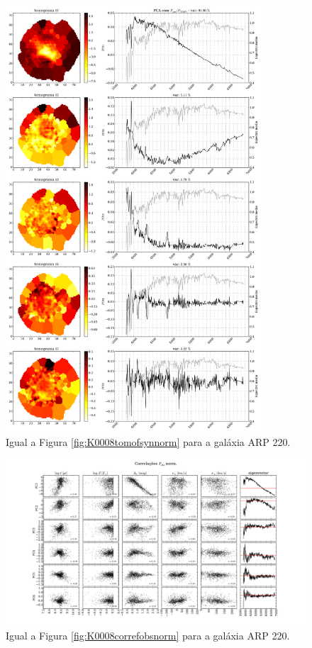 \begin{figure}
    \includegraphics[width=0.85\textwidth]{figuras/K0802-tomo-syn-norm.pdf}
    \caption[Tomogramas de 1 a 5 para o cubo $F_{obs}$ norm. - ARP 220.]
    {Igual a Figura \ref{fig:K0008tomofsynnorm} para a galáxia ARP 220.}
    \label{fig:K0802tomofsynnorm}
\end{figure}

\begin{figure}
    \includegraphics[width=1.3\textwidth, angle=-90]{figuras/K0802-correl-f_obs_norm-PCvsPhys.pdf}
	\caption[Correlações PCs vs. par\^ametros f\'isicos - $F_{obs}$ norm. - ARP 220.]
	{Igual a Figura \ref{fig:K0008correfobsnorm} para a galáxia ARP 220.}
    \label{fig:K0802correfobsnorm}
\end{figure}

